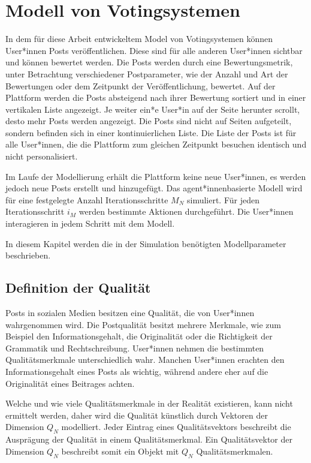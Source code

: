 \chapter{Modell von Votingsystemen}
\label{chapter:modell}

In dem für diese Arbeit entwickeltem Model von Votingsystemen können User*innen Posts veröffentlichen. Diese sind für alle anderen User*innen sichtbar und können bewertet werden. Die Posts werden durch eine Bewertungsmetrik, unter Betrachtung verschiedener Postparameter, wie der Anzahl und Art der Bewertungen oder dem Zeitpunkt der Veröffentlichung, bewertet. Auf der Plattform werden die Posts absteigend nach ihrer Bewertung sortiert und in einer vertikalen Liste angezeigt. Je weiter ein*e User*in auf der Seite herunter scrollt, desto mehr Posts werden angezeigt. Die Posts sind nicht auf Seiten aufgeteilt, sondern befinden sich in einer kontinuierlichen Liste. Die Liste der Posts ist für alle User*innen, die die Plattform zum gleichen Zeitpunkt besuchen identisch und nicht personalisiert.

Im Laufe der Modellierung erhält die Plattform keine neue User*innen, es werden jedoch neue Posts erstellt und hinzugefügt.
Das agent*innenbasierte Modell wird für eine festgelegte Anzahl Iterationsschritte $M_N$ simuliert. Für jeden Iterationsschritt $i_M$ werden bestimmte Aktionen durchgeführt. Die User*innen interagieren in jedem Schritt mit dem Modell.

In diesem Kapitel werden die in der Simulation benötigten Modellparameter beschrieben.

\section{Definition der Qualität}

Posts in sozialen Medien besitzen eine Qualität, die von User*innen wahrgenommen wird. Die Postqualität besitzt mehrere Merkmale, wie zum Beispiel den Informationsgehalt, die Originalität oder die Richtigkeit der Grammatik und Rechtschreibung. User*innen nehmen die bestimmten Qualitätsmerkmale unterschiedlich wahr. Manchen User*innen erachten den Informationsgehalt eines Posts als wichtig, während andere eher auf die Originalität eines Beitrages achten.

Welche und wie viele Qualitätsmerkmale in der Realität existieren, kann nicht ermittelt werden, daher wird die Qualität künstlich durch Vektoren der Dimension $Q_N$ modelliert. Jeder Eintrag eines Qualitätsvektors beschreibt die Ausprägung der Qualität in einem Qualitätsmerkmal. Ein Qualitätsvektor der Dimension $Q_N$ beschreibt somit ein Objekt mit $Q_N$ Qualitätsmerkmalen. 


